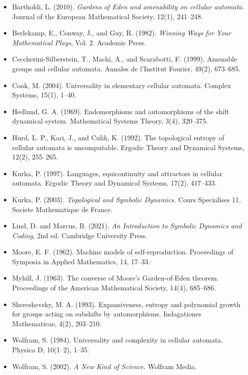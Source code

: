 \begin{itemize}
  \item Bartholdi, L. (2010). \textit{Gardens of Eden and amenability on cellular automata.} Journal of the European Mathematical Society, 12(1), 241--248.
  \item Berlekamp, E., Conway, J., and Guy, R. (1982). \textit{Winning Ways for Your Mathematical Plays}, Vol. 2. Academic Press.
  \item Ceccherini-Silberstein, T., Machi, A., and Scarabotti, F. (1999). Amenable groups and cellular automata. Annales de l'Institut Fourier, 49(2), 673--685.
  \item Cook, M. (2004). Universality in elementary cellular automata. Complex Systems, 15(1), 1--40.
  \item Hedlund, G. A. (1969). Endomorphisms and automorphisms of the shift dynamical system. Mathematical Systems Theory, 3(4), 320--375.
  \item Hurd, L. P., Kari, J., and Culik, K. (1992). The topological entropy of cellular automata is uncomputable. Ergodic Theory and Dynamical Systems, 12(2), 255--265.
  \item Kurka, P. (1997). Languages, equicontinuity and attractors in cellular automata. Ergodic Theory and Dynamical Systems, 17(2), 417--433.
  \item Kurka, P. (2003). \textit{Topological and Symbolic Dynamics.} Cours Specialises 11, Societe Mathematique de France.
  \item Lind, D. and Marcus, B. (2021). \textit{An Introduction to Symbolic Dynamics and Coding}, 2nd ed. Cambridge University Press.
  \item Moore, E. F. (1962). Machine models of self-reproduction. Proceedings of Symposia in Applied Mathematics, 14, 17--33.
  \item Myhill, J. (1963). The converse of Moore's Garden-of-Eden theorem. Proceedings of the American Mathematical Society, 14(4), 685--686.
  \item Shereshevsky, M. A. (1993). Expansiveness, entropy and polynomial growth for groups acting on subshifts by automorphisms. Indagationes Mathematicae, 4(2), 203--210.
  \item Wolfram, S. (1984). Universality and complexity in cellular automata. Physica D, 10(1--2), 1--35.
  \item Wolfram, S. (2002). \textit{A New Kind of Science.} Wolfram Media.
\end{itemize}
